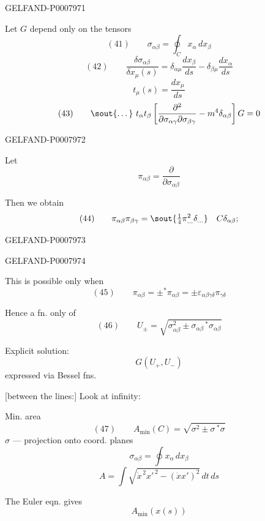 \begin{GelfandAdjacentEvidence}{GELFAND-P000797}{1}

Let \(G\) depend only on the tensors
\[
(41)\qquad \sigma_{\alpha\beta}=\oint_C x_\alpha\,dx_\beta
\]
\[
(42)\qquad \frac{\delta\sigma_{\alpha\beta}}{\delta x_\mu(s)}
=\delta_{\alpha\mu}\frac{dx_\beta}{ds}-\delta_{\beta\mu}\frac{dx_\alpha}{ds}
\]
\[
t_\mu(s)=\frac{dx_\mu}{ds}
\]
\[
(43)\qquad \text{\sout{\ldots}}\ t_\alpha t_\beta
\left[\frac{\partial^2}{\partial\sigma_{\alpha\gamma}\partial\sigma_{\beta\gamma}}
-m^4\delta_{\alpha\beta}\right]G=0
\]
\end{GelfandAdjacentEvidence}
\begin{GelfandAdjacentEvidence}{GELFAND-P000797}{2}


Let
\[
\pi_{\alpha\beta}=\frac{\partial}{\partial\sigma_{\alpha\beta}}
\]

Then we obtain
\[
(44)\qquad \pi_{\alpha\beta}\pi_{\beta\gamma}
=\text{\sout{\(\tfrac14\pi^2_{\ldots}\delta_{\ldots}\)}}\quad C\delta_{\alpha\beta};
\]
\end{GelfandAdjacentEvidence}
\begin{GelfandAdjacentEvidence}{GELFAND-P000797}{3}

\end{GelfandAdjacentEvidence}
\begin{GelfandAdjacentEvidence}{GELFAND-P000797}{4}


This is possible only when
\[
(45)\qquad \pi_{\alpha\beta}=\pm{}^*\pi_{\alpha\beta}
=\pm\varepsilon_{\alpha\beta\gamma\delta}\pi_{\gamma\delta}
\]

Hence a fn. only of
\[
(46)\qquad U_\pm=\sqrt{\sigma_{\alpha\beta}^2
\pm\sigma_{\alpha\beta}\,{}^*\sigma_{\alpha\beta}}
\]

Explicit solution:
\[
G(U_+,U_-)
\]
expressed via Bessel fns.

[between the lines:] Look at infinity:

Min. area
\[
(47)\qquad A_{\min}(C)=\sqrt{\sigma^2\pm\sigma\,{}^*\sigma}
\]
\(\sigma\) --- projection onto coord. planes
\[
\sigma_{\alpha\beta}=\oint x_\alpha\,dx_\beta
\]
\[
A=\int\sqrt{\dot{x}^{\,2}x'^{\,2}-(\dot{x}x')^2}\,dt\,ds
\]

The Euler eqn. gives
\[
A_{\min}(x(s))
\]
\end{GelfandAdjacentEvidence}



